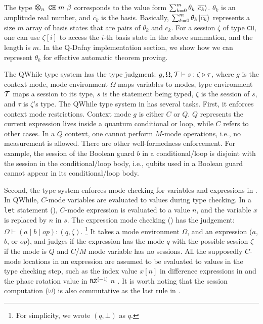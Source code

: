 The type $\ttype{n}{\tch{m}{\beta}}$ corresponds to the value form $\sum_{k=0}^{m}\theta_k\ket{\overline{c_k}}$.
$\theta_k$ is an amplitude real number, and $\overline{c_k}$ is the basis.
Basically, $\sum_{k=0}^{m}\theta_k\ket{\overline{c_k}}$ represents a size $m$ array of basis states
that are pairs of $\theta_k$ and $\overline{c_k}$. For a session $\zeta$ of type $\texttt{CH}$,
one can use $\zeta[i]$ to access the $i$-th basis state in the above summation, and the length is $m$.
In the Q-Dafny implementation section, we show how we can represent $\theta_k$ for effective automatic theorem proving.


The QWhile type system has the type judgment: $g,\Omega,\itau\vdash s : \zeta\triangleright \tau$, where $g$ is the context mode, mode environment $\Omega$ maps variables to modes, type environment $\itau$ maps a session to its type, $s$ is the statement being typed, $\zeta$ is the session of $s$, and $\tau$ is $\zeta$'s type. 
The QWhile type system in  has several tasks. First, it enforces context mode restrictions.
Context mode $g$ is either $C$ or $Q$.
$Q$ represents the current expression lives inside a quantum conditional or loop, while $C$ refers to other cases.
In a $Q$ context, one cannot perform $M$-mode operations, i.e., no measurement is allowed.
There are other well-formedness enforcement. For example,
the session of the Boolean guard $b$ in a conditional/loop is disjoint with the session in the conditional/loop body,
i.e., qubits used in a Boolean guard cannot appear in its conditional/loop body.

Second, the type system enforces mode checking for variables and expressions in .
In QWhile, $C$-mode variables are evaluated to values during type checking.
In a \texttt{let} statement (),
$C$-mode expression is evaluated to a value $n$, and the variable $x$ is replaced by $n$ in $s$.
The expression mode checking () has the judgement: $\Omega \vdash (a\mid b \mid op) : (q,\zeta)$. \footnote{For simplicity, we wrote $(q,\bot)$ as $q$. } It takes a mode environment $\Omega$, and an expression ($a$, $b$, or $op$), and judges if the expression has the mode $q$ with the possible session $\zeta$ if the mode is $Q$ and $C$/$M$ mode variable has no sessions.
All the supposedly $C$-mode locations in an expression are assumed
to be evaluated to values in the type checking step,
such as the index value $x[n]$ in difference expressions in 
and the phase rotation value in $\irz[\lbrack -1 \rbrack]{n}{}$.
It is worth noting that the session computation ($\uplus$)
is also commutative as the last rule in .

